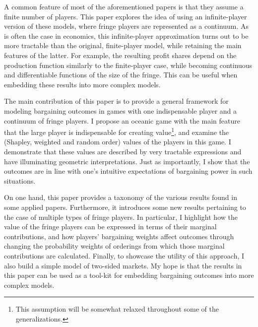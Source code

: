\documentclass[a4paper]{article}
\begin{document}
A common feature of most of the aforementioned papers is that they assume a finite number of players.
This paper explores the idea of using an infinite-player version of these models, where fringe players are represented as a continuum.
As is often the case in economics, this infinite-player approximation turns out to be more tractable than the original, finite-player model, while retaining the main features of the latter.
For example, the resulting profit shares depend on the production function similarly to the finite-player case, while becoming continuous and differentiable functions of the size of the fringe.
This can be useful when embedding these results into more complex models.

The main contribution of this paper is to provide a general framework for modeling bargaining outcomes in games with one indispensable player and a continuum of fringe players.
I propose an oceanic game with the main feature that the large player is indispensable for creating value\footnote{
    This assumption will be somewhat relaxed throughout some of the generalizations.
}, and examine the (Shapley, weighted and random order) values of the players in this game.
I demonstrate that these values are described by very tractable expressions and have illuminating geometric interpretations.
Just as importantly, I show that the outcomes are in line with one's intuitive expectations of bargaining power in such situations.

On one hand, this paper provides a taxonomy of the various results found in some applied papers.
Furthermore, it introduces some new results pertaining to the case of multiple types of fringe players.
In particular, I highlight how the value of the fringe players can be expressed in terms of their marginal contributions, and how players' bargaining weights affect outcomes through changing the probability weights of orderings from which those marginal contributions are calculated.
Finally, to showcase the utility of this approach, I also build a simple model of two-sided markets.
My hope is that the results in this paper can be used as a tool-kit for embedding bargaining outcomes into more complex models.
\end{document}
